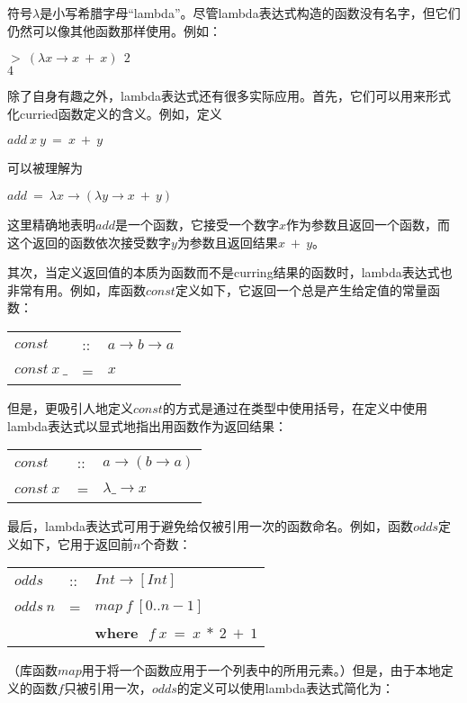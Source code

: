 符号$\lambda$是小写希腊字母“lambda”。尽管lambda表达式构造的函数没有名字，但它们仍然可以像其他函数那样使用。例如：

\noindent\hspace*{1cm} $>~(\lambda x \rightarrow x~+~x)~~2$\\
\hspace*{1cm} $4$

除了自身有趣之外，lambda表达式还有很多实际应用。首先，它们可以用来形式化curried函数定义的含义。例如，定义

\noindent\hspace*{1cm} $add~x~y~=~x~+~y$

可以被理解为

\noindent\hspace*{1cm} $add~=~\lambda x \rightarrow (\lambda y \rightarrow x~+~y)$

这里精确地表明$add$是一个函数，它接受一个数字$x$作为参数且返回一个函数，而这个返回的函数依次接受数字$y$为参数且返回结果$x~+~y$。

其次，当定义返回值的本质为函数而不是curring结果的函数时，lambda表达式也非常有用。例如，库函数$const$定义如下，它返回一个总是产生给定值的常量函数：

\begin{tabular}[t]{lll}
$const$&::&$a \rightarrow b \rightarrow a$\\
$const~x~\_$&=&$x$\\
\end{tabular}

但是，更吸引人地定义$const$的方式是通过在类型中使用括号，在定义中使用lambda表达式以显式地指出用函数作为返回结果：

\begin{tabular}[t]{lll}
$const$&::&$a \rightarrow (b \rightarrow a)$\\
$const~x~$&=&$\lambda \_ \rightarrow x$\\
\end{tabular}

最后，lambda表达式可用于避免给仅被引用一次的函数命名。例如，函数$odds$定义如下，它用于返回前$n$个奇数：

\begin{tabular}[t]{lll}
$odds$&::&$Int \rightarrow [Int]$\\
$odds~n$&=&$map~f~[0..n-1]$\\
& &\textbf{where}~$~f~x~=~x~*~2~+~1$\\
\end{tabular}

（库函数$map$用于将一个函数应用于一个列表中的所用元素。）但是，由于本地定义的函数$f$只被引用一次，$odds$的定义可以使用lambda表达式简化为：

